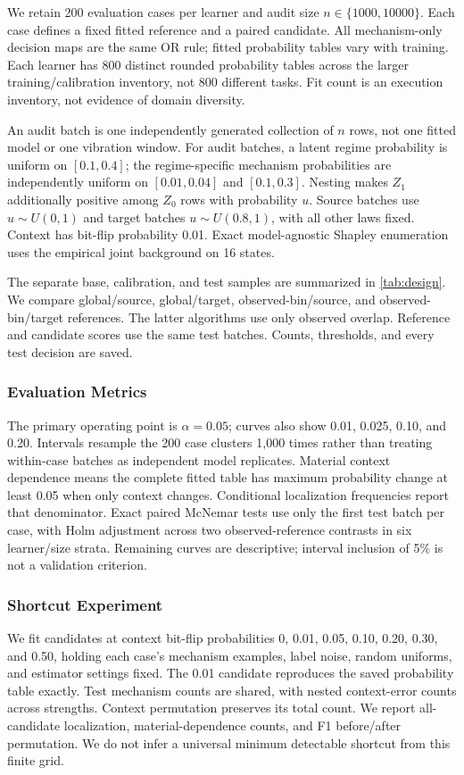 \documentclass[conference]{IEEEtran}
\begin{document}
We retain 200 evaluation cases per learner and audit size $n\in\{1000,10000\}$. Each case defines a fixed fitted reference and a paired candidate. All mechanism-only decision maps are the same OR rule; fitted probability tables vary with training. Each learner has 800 distinct rounded probability tables across the larger training/calibration inventory, not 800 different tasks. Fit count is an execution inventory, not evidence of domain diversity.

An audit batch is one independently generated collection of $n$ rows, not one fitted model or one vibration window. For audit batches, a latent regime probability is uniform on $[0.1,0.4]$; the regime-specific mechanism probabilities are independently uniform on $[0.01,0.04]$ and $[0.1,0.3]$. Nesting makes $Z_1$ additionally positive among $Z_0$ rows with probability $u$. Source batches use $u\sim U(0,1)$ and target batches $u\sim U(0.8,1)$, with all other laws fixed. Context has bit-flip probability 0.01. Exact model-agnostic Shapley enumeration uses the empirical joint background on 16 states.

The separate base, calibration, and test samples are summarized in \cref{tab:design}. We compare global/source, global/target, observed-bin/source, and observed-bin/target references. The latter algorithms use only observed overlap. Reference and candidate scores use the same test batches. Counts, thresholds, and every test decision are saved.

\subsubsection{Evaluation Metrics}
The primary operating point is $\alpha=0.05$; curves also show 0.01, 0.025, 0.10, and 0.20. Intervals resample the 200 case clusters 1,000 times rather than treating within-case batches as independent model replicates. Material context dependence means the complete fitted table has maximum probability change at least 0.05 when only context changes. Conditional localization frequencies report that denominator. Exact paired McNemar tests use only the first test batch per case, with Holm adjustment across two observed-reference contrasts in six learner/size strata. Remaining curves are descriptive; interval inclusion of 5\% is not a validation criterion.

\subsubsection{Shortcut Experiment}
We fit candidates at context bit-flip probabilities 0, 0.01, 0.05, 0.10, 0.20, 0.30, and 0.50, holding each case's mechanism examples, label noise, random uniforms, and estimator settings fixed. The 0.01 candidate reproduces the saved probability table exactly. Test mechanism counts are shared, with nested context-error counts across strengths. Context permutation preserves its total count. We report all-candidate localization, material-dependence counts, and F1 before/after permutation. We do not infer a universal minimum detectable shortcut from this finite grid.
\end{document}
